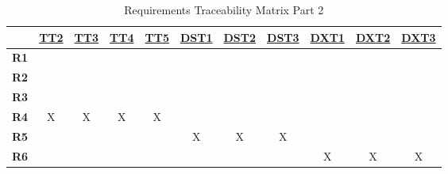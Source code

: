 \documentclass[12pt, titlepage]{article}
\begin{document}
\begin{table}[H]
  \centering
  \begin{tabular}{|c|c|c|c|c|c|c|c|c|c|c|}
    \hline
                & \hyperref[TT2]{TT2} & \hyperref[TT3]{TT3} & \hyperref[TT4]{TT4} & \hyperref[TT5]{TT5} & \hyperref[DST1]{DST1} & \hyperref[DST2]{DST2} & \hyperref[DST3]{DST3} & \hyperref[DXT1]{DXT1} & \hyperref[DXT2]{DXT2} & \hyperref[DXT3]{DXT3} \\
    \hline
    \textbf{R1} &                     &                     &                     &                     &                       &                       &                       &                       &                       &                       \\ \hline
    \textbf{R2} &                     &                     &                     &                     &                       &                       &                       &                       &                       &                       \\ \hline
    \textbf{R3} &                     &                     &                     &                     &                       &                       &                       &                       &                       &                       \\ \hline
    \textbf{R4} & X                   & X                   & X                   & X                   &                       &                       &                       &                       &                       &                       \\ \hline
    \textbf{R5} &                     &                     &                     &                     & X                     & X                     & X                     &                       &                       &                       \\ \hline
    \textbf{R6} &                     &                     &                     &                     &                       &                       &                       & X                     & X                     & X                     \\ \hline
  \end{tabular}
  \caption{Requirements Traceability Matrix Part 2}
  \label{Table:B_Req_trace}
\end{table}
\end{document}
